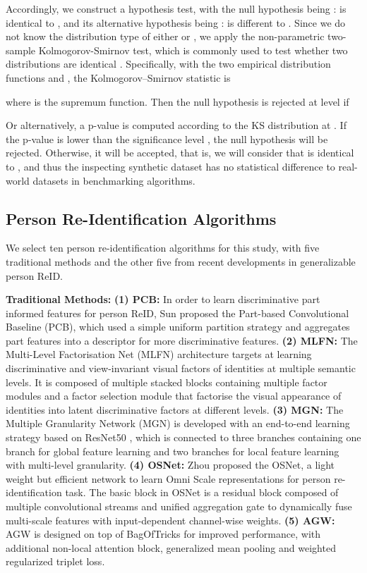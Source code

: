 \documentclass[10pt,twocolumn,letterpaper]{article}
\begin{document}
Accordingly, we construct a hypothesis test, with the null hypothesis being :  is identical to , and its alternative hypothesis being :  is different to . Since we do not know the distribution type of either  or , we apply the non-parametric two-sample Kolmogorov-Smirnov test, which is commonly used to test whether two distributions are identical \cite{NAAMAN2021109088}. Specifically, with the two empirical distribution functions  and , the Kolmogorov–Smirnov statistic is


where  is the supremum function. Then the null hypothesis is rejected at level  if



Or alternatively, a p-value is computed according to the KS distribution at . If the p-value is lower than the significance level , the null hypothesis will be rejected. Otherwise, it will be accepted, that is, we will consider that  is identical to , and thus the inspecting synthetic dataset has no statistical difference to real-world datasets in benchmarking algorithms.

\subsection{Person Re-Identification Algorithms}\label{sec:algo}



We select ten person re-identification algorithms for this study, with five traditional methods and the other five from recent developments in generalizable person ReID.

\textbf{Traditional Methods:}
\textbf{(1) PCB:} In order to learn discriminative part informed features for person ReID, Sun \etal \cite{sun2018pcb} proposed the Part-based Convolutional Baseline (PCB), which used a simple uniform partition strategy and aggregates part features into a descriptor for more discriminative features. 
\textbf{(2) MLFN:} The Multi-Level Factorisation Net (MLFN) architecture \cite{chang18mlfn} targets at learning discriminative and view-invariant visual factors of identities at multiple semantic levels. It is composed of multiple stacked blocks containing multiple factor modules and a factor selection module that factorise the visual appearance of identities into latent discriminative factors at different levels. 
\textbf{(3) MGN:} The Multiple Granularity Network (MGN) \cite{wang2018learning} is developed with an end-to-end learning strategy based on ResNet50 \cite{he2016deep}, which is connected to three branches containing one branch for global feature learning and two branches for local feature learning with multi-level granularity. 
\textbf{(4) OSNet:} Zhou \etal \cite{Zhou2019-OSNet} proposed the OSNet, a light weight but efficient network to learn Omni Scale representations for person re-identification task. The basic block in OSNet is a residual block composed of multiple convolutional streams and unified aggregation gate to dynamically fuse multi-scale features with input-dependent channel-wise weights. 
\textbf{(5) AGW:} AGW \cite{ye2022survey} is designed on top of BagOfTricks \cite{Luo19BOT} for improved performance, with additional non-local attention block, generalized mean pooling and weighted regularized triplet loss.
\end{document}
